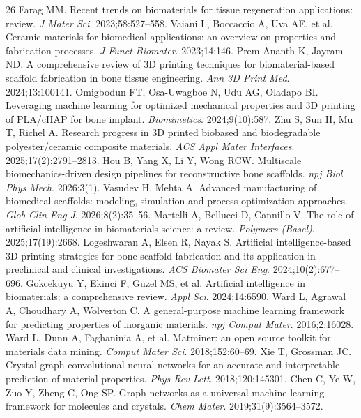 \documentclass[11pt,a4paper]{article}
\begin{document}
\begin{thebibliography}{26}
 Farag MM. Recent trends on biomaterials for tissue regeneration applications: review. \textit{J Mater Sci}. 2023;58:527--558.
 Vaiani L, Boccaccio A, Uva AE, et al. Ceramic materials for biomedical applications: an overview on properties and fabrication processes. \textit{J Funct Biomater}. 2023;14:146.
 Prem Ananth K, Jayram ND. A comprehensive review of 3D printing techniques for biomaterial-based scaffold fabrication in bone tissue engineering. \textit{Ann 3D Print Med}. 2024;13:100141.
 Omigbodun FT, Osa-Uwagboe N, Udu AG, Oladapo BI. Leveraging machine learning for optimized mechanical properties and 3D printing of PLA/cHAP for bone implant. \textit{Biomimetics}. 2024;9(10):587.
 Zhu S, Sun H, Mu T, Richel A. Research progress in 3D printed biobased and biodegradable polyester/ceramic composite materials. \textit{ACS Appl Mater Interfaces}. 2025;17(2):2791--2813.
 Hou B, Yang X, Li Y, Wong RCW. Multiscale biomechanics-driven design pipelines for reconstructive bone scaffolds. \textit{npj Biol Phys Mech}. 2026;3(1).
 Vasudev H, Mehta A. Advanced manufacturing of biomedical scaffolds: modeling, simulation and process optimization approaches. \textit{Glob Clin Eng J}. 2026;8(2):35--56.
 Martelli A, Bellucci D, Cannillo V. The role of artificial intelligence in biomaterials science: a review. \textit{Polymers (Basel)}. 2025;17(19):2668.
 Logeshwaran A, Elsen R, Nayak S. Artificial intelligence-based 3D printing strategies for bone scaffold fabrication and its application in preclinical and clinical investigations. \textit{ACS Biomater Sci Eng}. 2024;10(2):677--696.
 Gokcekuyu Y, Ekinci F, Guzel MS, et al. Artificial intelligence in biomaterials: a comprehensive review. \textit{Appl Sci}. 2024;14:6590.
 Ward L, Agrawal A, Choudhary A, Wolverton C. A general-purpose machine learning framework for predicting properties of inorganic materials. \textit{npj Comput Mater}. 2016;2:16028.
 Ward L, Dunn A, Faghaninia A, et al. Matminer: an open source toolkit for materials data mining. \textit{Comput Mater Sci}. 2018;152:60--69.
 Xie T, Grossman JC. Crystal graph convolutional neural networks for an accurate and interpretable prediction of material properties. \textit{Phys Rev Lett}. 2018;120:145301.
 Chen C, Ye W, Zuo Y, Zheng C, Ong SP. Graph networks as a universal machine learning framework for molecules and crystals. \textit{Chem Mater}. 2019;31(9):3564--3572.

\end{thebibliography}
\end{document}
